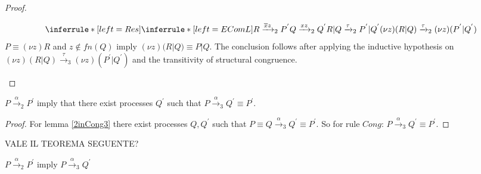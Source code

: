 \begin{lemma}
\begin{proof}
\begin{description}
\begin{itemize}
		\[
		  \inferrule* [left=Res]{
		    \inferrule* [left=EComL]{
			R \xrightarrow{\overline{x}z}_{2} P^{'}
		      \\
			Q \xrightarrow{xz}_{2} Q^{'}
		    }{
		      R|Q \xrightarrow{\tau}_{2} P^{'}|Q^{'}
		    }
		  }{
		    (\nu z)(R|Q) \xrightarrow{\tau}_{2} (\nu z)(P^{'}|Q^{'})
		  }
		\]
		$P \equiv (\nu z)R$ and $z \notin fn(Q)$ imply $(\nu z)(R|Q) \equiv P|Q$. The conclusion follows after applying the inductive hypothesis on $(\nu z)(R|Q) \xrightarrow{\tau}_{3} (\nu z)(P^{'}|Q^{'})$ and the transitivity of structural congruence.
	    \end{itemize}	    
	\end{description}
  \end{proof}
  \label{2inCong3}
\end{lemma}

\begin{theorem}
  $P\xrightarrow{\alpha}_{2} P^{'}$ imply that there exist processes $Q^{'}$ such that  $P \xrightarrow{\alpha}_{3} Q^{'} \equiv P^{'}$.
  \begin{proof}
    For lemma \ref{2inCong3} there exist processes $Q, Q^{'}$ such that $P \equiv Q \xrightarrow{\alpha}_{3} Q^{'} \equiv P^{'}$. So for rule $Cong$: $P \xrightarrow{\alpha}_{3} Q^{'} \equiv P^{'}$.
  \end{proof}
\end{theorem}

VALE IL TEOREMA SEGUENTE?
\begin{theorem}
  $P\xrightarrow{\alpha}_{2} P^{'}$ imply $P \xrightarrow{\alpha}_{3} Q^{'}$
\end{theorem}



